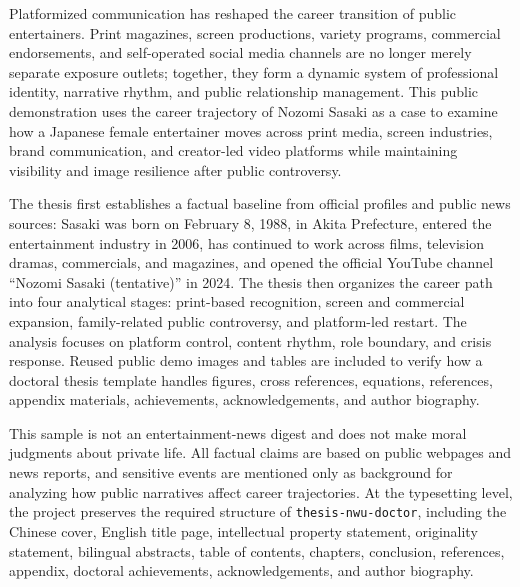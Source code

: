 
Platformized communication has reshaped the career transition of public entertainers. Print magazines, screen productions, variety programs, commercial endorsements, and self-operated social media channels are no longer merely separate exposure outlets; together, they form a dynamic system of professional identity, narrative rhythm, and public relationship management. This public demonstration uses the career trajectory of Nozomi Sasaki as a case to examine how a Japanese female entertainer moves across print media, screen industries, brand communication, and creator-led video platforms while maintaining visibility and image resilience after public controversy.

The thesis first establishes a factual baseline from official profiles and public news sources: Sasaki was born on February 8, 1988, in Akita Prefecture, entered the entertainment industry in 2006, has continued to work across films, television dramas, commercials, and magazines, and opened the official YouTube channel ``Nozomi Sasaki (tentative)'' in 2024. The thesis then organizes the career path into four analytical stages: print-based recognition, screen and commercial expansion, family-related public controversy, and platform-led restart. The analysis focuses on platform control, content rhythm, role boundary, and crisis response. Reused public demo images and tables are included to verify how a doctoral thesis template handles figures, cross references, equations, references, appendix materials, achievements, acknowledgements, and author biography.

This sample is not an entertainment-news digest and does not make moral judgments about private life. All factual claims are based on public webpages and news reports, and sensitive events are mentioned only as background for analyzing how public narratives affect career trajectories. At the typesetting level, the project preserves the required structure of \texttt{thesis-nwu-doctor}, including the Chinese cover, English title page, intellectual property statement, originality statement, bilingual abstracts, table of contents, chapters, conclusion, references, appendix, doctoral achievements, acknowledgements, and author biography.

\nwuKeywordsEnLine
